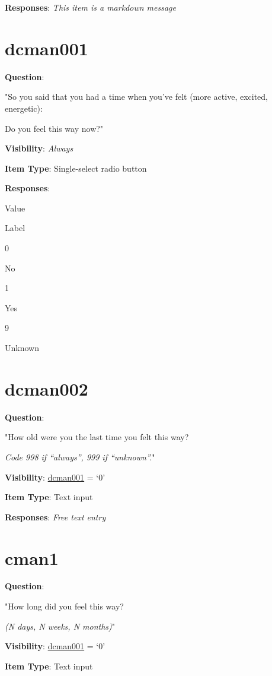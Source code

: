 \documentclass[]{book}
\begin{document}
\textbf{Responses}: \emph{This item is a markdown message}

\hypertarget{dcman001}{%
\section{dcman001}\label{dcman001}}

\textbf{Question}:

"So you said that you had a time when you've felt (more active, excited, energetic):

Do you feel this way now?"

\textbf{Visibility}: \emph{Always}

\textbf{Item Type}: Single-select radio button

\textbf{Responses}:

Value

Label

0

No

1

Yes

9

Unknown

\hypertarget{dcman002}{%
\section{dcman002}\label{dcman002}}

\textbf{Question}:

"How old were you the last time you felt this way?

\emph{Code 998 if ``always'', 999 if ``unknown''.}"

\textbf{Visibility}: \protect\hyperlink{dcman001}{dcman001} = `0'

\textbf{Item Type}: Text input

\textbf{Responses}: \emph{Free text entry}

\hypertarget{cman1}{%
\section{cman1}\label{cman1}}

\textbf{Question}:

"How long did you feel this way?

\emph{(N days, N weeks, N months)}"

\textbf{Visibility}: \protect\hyperlink{dcman001}{dcman001} = `0'

\textbf{Item Type}: Text input
\end{document}
